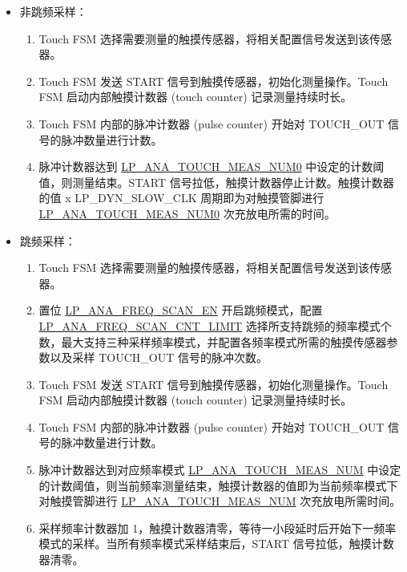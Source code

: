 \documentclass[main\_\_CN.tex]{subfiles}
\begin{document}
\begin{itemize}
    \item 非跳频采样：
        \begin{enumerate}
            \item Touch FSM 选择需要测量的触摸传感器，将相关配置信号发送到该传感器。
            \item Touch FSM 发送 START 信号到触摸传感器，初始化测量操作。Touch FSM 启动内部触摸计数器 (touch counter) 记录测量持续时长。
            \item Touch FSM 内部的脉冲计数器 (pulse counter) 开始对 TOUCH\_OUT 信号的脉冲数量进行计数。
            \item 脉冲计数器达到 \hyperref[fielddesc:LPANATOUCHMEASNUM0]{LP\_ANA\_TOUCH\_MEAS\_NUM0} 中设定的计数阈值，则测量结束。START 信号拉低，触摸计数器停止计数。触摸计数器的值 x LP\_DYN\_SLOW\_CLK 周期即为对触摸管脚进行 \hyperref[fielddesc:LPANATOUCHMEASNUM0]{LP\_ANA\_TOUCH\_MEAS\_NUM0} 次充放电所需的时间。
        \end{enumerate}
    \item 跳频采样：
        \begin{enumerate}
            \item Touch FSM 选择需要测量的触摸传感器，将相关配置信号发送到该传感器。
            \item 置位 \hyperref[fielddesc:LPANAFREQSCANEN]{LP\_ANA\_FREQ\_SCAN\_EN} 开启跳频模式，配置 \hyperref[fielddesc:LPANAFREQSCANCNTLIMIT]{LP\_ANA\_FREQ\_SCAN\_CNT\_LIMIT} 选择所支持跳频的频率模式个数，最大支持三种采样频率模式，并配置各频率模式所需的触摸传感器参数以及采样 TOUCH\_OUT 信号的脉冲次数。
            \item Touch FSM 发送 START 信号到触摸传感器，初始化测量操作。Touch FSM 启动内部触摸计数器 (touch counter) 记录测量持续时长。
            \item Touch FSM 内部的脉冲计数器 (pulse counter) 开始对 TOUCH\_OUT 信号的脉冲数量进行计数。
            \item 脉冲计数器达到对应频率模式 \hyperref[fielddesc:LPANATOUCHMEASNUM0]{LP\_ANA\_TOUCH\_MEAS\_NUM} 中设定的计数阈值，则当前频率测量结束，触摸计数器的值即为当前频率模式下对触摸管脚进行 \hyperref[fielddesc:LPANATOUCHMEASNUM0]{LP\_ANA\_TOUCH\_MEAS\_NUM} 次充放电所需时间。
            \item 采样频率计数器加 1，触摸计数器清零，等待一小段延时后开始下一频率模式的采样。当所有频率模式采样结束后，START 信号拉低，触摸计数器清零。
        \end{enumerate}
\end{itemize}
\end{document}

